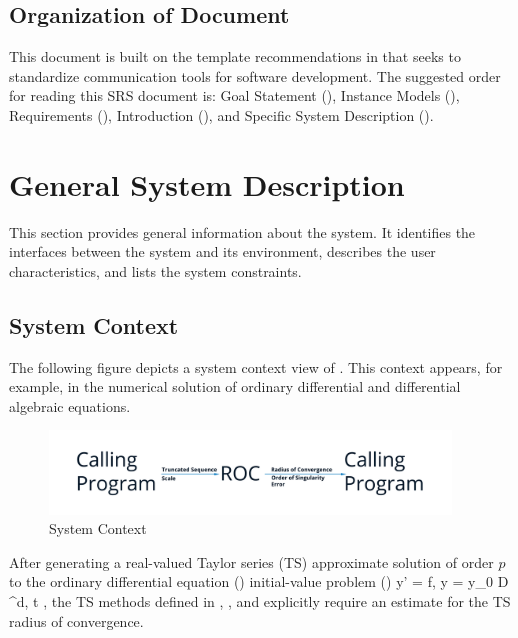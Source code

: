 \documentclass[12pt]{article}
\begin{document}
\subsection{Organization of Document}

This document is built on the template recommendations in \citet{SmithAndLai2005, SmithEtAl2007} that
 seeks to standardize communication tools for software development. The suggested order for reading
 this SRS document is: Goal Statement (), Instance Models (),
 Requirements (), Introduction (), and
 Specific System Description ().

\section{General System Description}

This section provides general information about the system.  It identifies the
interfaces between the system and its environment, describes the user
characteristics, and lists the system constraints.  

\subsection{System Context}\label{ssc:systemcontext}

The following figure depicts a system context view of . This
context appears, for example, in the numerical solution of ordinary differential and
differential algebraic equations.

\begin{figure}[h!]
\begin{center}
 \includegraphics[width=0.95\textwidth]{roc-system-context}
\caption{System Context}
\label{fg:systemcontext} 
\end{center}
\end{figure}

After generating a real-valued Taylor series (TS) approximate solution of order $p$ to the
ordinary differential equation (\ode) initial-value problem (\ivp) 
\EQ
{
  \label{eq:introduction-mathematical-odeivp}
  y' = f,
  \quad
  y = y_0 \in \mathcal D \subset \Rz^d,
  \quad
  t \in \iode \subset \Rz,
}
the TS methods defined in
\cite{jorba2005software},
\cite{bergsma2016application},
and \cite{chang1982} explicitly require an estimate for the TS radius of convergence.
\end{document}
